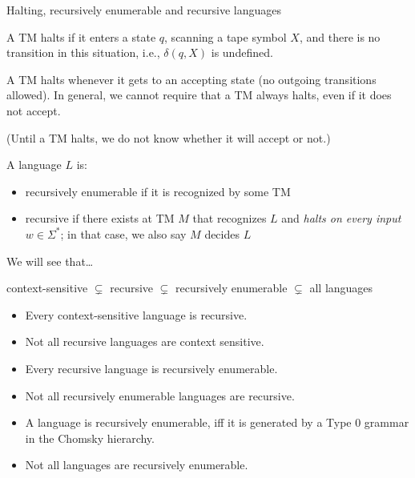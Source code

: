 \documentclass[handout]{beamer}
\begin{document}
\begin{frame}{Halting, recursively enumerable and recursive languages}
        
    \begin{definition}
        A TM \alert{halts} if it enters a state $q$, scanning a tape symbol $X$, and there is no transition in this situation, i.e., $\delta(q,X)$ is undefined.
    \end{definition}

    A TM halts whenever it gets to an accepting state (no outgoing transitions allowed). In general, we cannot require that a TM always halts, even if it does not accept.

    (Until a TM halts, we  do not know whether it will accept or not.)

    \smallskip

    \begin{definition}
        A language $L$ is:
        \begin{itemize}
            \item \alert{recursively enumerable} if it is \alert{recognized} by some TM
            \item \alert{recursive} if there exists at TM $M$ that recognizes $L$ and \emph{halts on every input} $w\in\Sigma^*$; in that case, we also say $M$ \alert{decides} $L$
        \end{itemize}
    \end{definition}
  
\end{frame}


\begin{frame}{We will see that\dots}

    \begin{center}
        \Large
        context-sensitive $\subsetneq$ recursive $\subsetneq$ recursively enumerable $\subsetneq$ all languages
    \end{center}


    \begin{itemize}
        \item Every context-sensitive language is recursive.
        \item Not all recursive languages are context sensitive.
        \item Every recursive language is recursively enumerable.
        \item Not all recursively enumerable languages are recursive.
        \item A language is recursively enumerable, iff it is generated by a Type 0 grammar in the Chomsky hierarchy.
        \item Not all languages are recursively enumerable.   
    \end{itemize}

\end{frame}
\end{document}
